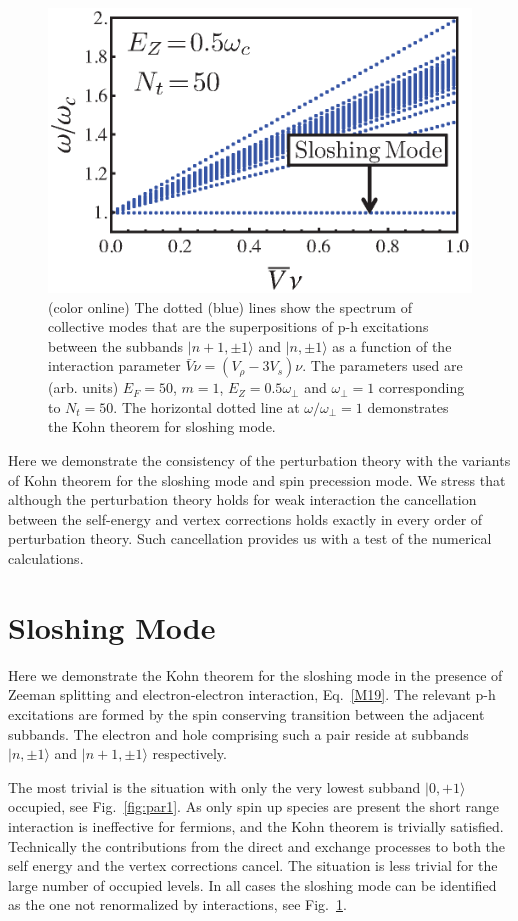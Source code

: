 \begin{figure}[h]
\begin{center}
\includegraphics[width=0.6\columnwidth]{fig9.eps}
\caption{(color online) The dotted (blue) lines show the spectrum of collective modes that are the superpositions of p-h excitations between the subbands $|n+1,\pm1\rangle$ and $|n,\pm1\rangle$ as a function of the interaction parameter $\bar{V} \nu =(V_{\rho} - 3 V_s) \nu$.
The parameters used are (arb. units) $E_F = 50$,  $m=1$, $E_Z = 0.5 \omega_{\perp}$ and $\omega_{\perp} = 1$ corresponding to $N_t = 50$. 
The horizontal dotted line at $\omega/\omega_{\perp} =1$ demonstrates the Kohn theorem for sloshing mode.\cite{Iqbal}}
\label{fig:app_slosh}
\end{center}
\end{figure}




Here we demonstrate the consistency of the perturbation theory with the variants of Kohn theorem for the sloshing mode and spin precession mode.
We stress that although the perturbation theory holds for weak interaction the cancellation between the self-energy and vertex corrections holds exactly in every order of perturbation theory.
Such cancellation provides us with a test of the numerical calculations.

\section{Sloshing Mode}
Here we demonstrate the Kohn theorem for the sloshing mode in the presence of Zeeman splitting and electron-electron interaction, Eq.~\eqref{M19}.
The relevant p-h excitations are formed by the spin conserving transition between the adjacent subbands.
The electron and hole comprising such a pair reside at subbands $|n,\pm1\rangle$ and $|n+1,\pm 1\rangle$ respectively.

The most trivial is the situation with only the very lowest subband $|0,+1\rangle$ occupied, see Fig.~\ref{fig:par1}.
As only spin up species are present the short range interaction is ineffective for fermions, and the Kohn theorem is trivially satisfied.
Technically the contributions from the direct and exchange processes to both the self energy and the vertex corrections cancel.
The situation is less trivial for the large number of occupied levels.
In all cases the sloshing mode can be identified as the one not renormalized by interactions, see Fig.~\ref{fig:app_slosh}.

